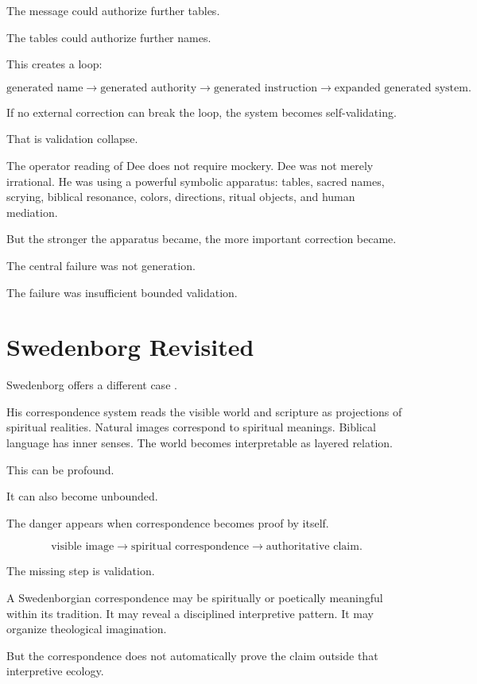 \documentclass[11pt]{book}
\begin{document}
The message could authorize further tables.

The tables could authorize further names.

This creates a loop:

\[
\text{generated name}
\rightarrow
\text{generated authority}
\rightarrow
\text{generated instruction}
\rightarrow
\text{expanded generated system}.
\]

If no external correction can break the loop, the system becomes self-validating.

That is validation collapse.

The operator reading of Dee does not require mockery. Dee was not merely irrational. He was using a powerful symbolic apparatus: tables, sacred names, scrying, biblical resonance, colors, directions, ritual objects, and human mediation.

But the stronger the apparatus became, the more important correction became.

The central failure was not generation.

The failure was insufficient bounded validation.

\section{Swedenborg Revisited}

Swedenborg offers a different case \cite{SwedenborgHeavenHell,Swedenborg1749Arcana}.

His correspondence system reads the visible world and scripture as projections of spiritual realities. Natural images correspond to spiritual meanings. Biblical language has inner senses. The world becomes interpretable as layered relation.

This can be profound.

It can also become unbounded.

The danger appears when correspondence becomes proof by itself.

\[
\text{visible image}
\rightarrow
\text{spiritual correspondence}
\rightarrow
\text{authoritative claim}.
\]

The missing step is validation.

A Swedenborgian correspondence may be spiritually or poetically meaningful within its tradition. It may reveal a disciplined interpretive pattern. It may organize theological imagination.

But the correspondence does not automatically prove the claim outside that interpretive ecology.
\end{document}
